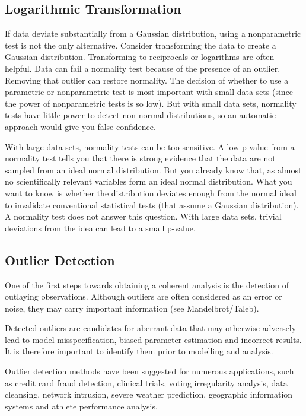 \documentclass[MdouleBmain.tex]{subfiles}
\begin{document}
\subsection{Logarithmic  Transformation}

If data deviate substantially from a Gaussian distribution, using a nonparametric test is not the only alternative. Consider transforming the data to create a Gaussian distribution. Transforming to reciprocals or logarithms are often helpful.
Data can fail a normality test because of the presence of an outlier. Removing that outlier can restore normality.
The decision of whether to use a parametric or nonparametric test is most important with small data sets (since the power of nonparametric tests is so low). But with small data sets, normality tests have little power to detect non-normal distributions, so an automatic approach would give you false confidence.

With large data sets, normality tests can be too sensitive. A low p-value from a normality test tells you that there is strong evidence that the data are not sampled from an ideal normal distribution. But you already know that, as almost no scientifically relevant variables form an ideal normal distribution. What you want to know is whether the distribution deviates enough from the normal ideal to invalidate conventional statistical tests (that assume a Gaussian distribution). A normality test does not answer this question. With large data sets, trivial deviations from the idea can lead to a small p-value.

\subsection{Outlier Detection}
One of the first steps towards obtaining a coherent analysis is the detection of outlaying observations. Although outliers are often considered as an error or noise, they may carry important information (see Mandelbrot/Taleb).

Detected outliers are candidates for aberrant data that may otherwise adversely lead to model misspecification, biased parameter estimation and incorrect results. It is therefore
important to identify them prior to modelling and analysis.

Outlier detection methods have been suggested for numerous applications, such as credit card fraud detection, clinical trials, voting irregularity analysis, data cleansing, network intrusion, severe weather prediction, geographic information systems and athlete performance analysis.
\end{document}

